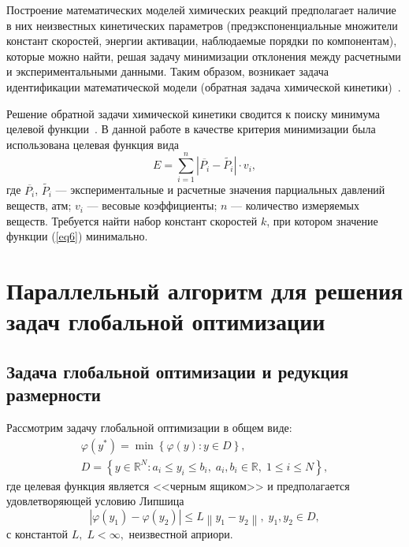 \documentclass{cmi1}
\begin{document}
Построение математических моделей химических реакций предполагает наличие в них неизвестных кинетических параметров (предэкспоненциальные множители констант скоростей, энергии активации, наблюдаемые порядки по компонентам), которые можно найти, решая задачу минимизации отклонения между расчетными и экспериментальными данными. Таким образом, возникает задача идентификации математической модели (обратная задача химической кинетики)~.

Решение обратной задачи химической кинетики сводится к поиску минимума целевой функции~. В данной работе в качестве критерия минимизации была использована целевая функция вида
\begin{equation}\label{eq6}
E=\sum_{i=1}^n \left|\overline{P_{i}}-\widetilde{P_{i}}\right|\cdot v_{i},
\end{equation}
где $\overline{P_{i}}$, $\widetilde{P_{i}}$ --- экспериментальные и расчетные значения парциальных давлений веществ, атм; $v_{i}$ --- весовые коэффициенты; $n$ --- количество измеряемых веществ.
Требуется найти набор констант скоростей $k$, при котором значение функции (\ref{eq6}) минимально.

\section{Параллельный алгоритм для решения задач глобальной оптимизации} \label{sec-PGSA}
\subsection{Задача глобальной оптимизации и редукция размерности}

Рассмотрим задачу глобальной оптимизации в общем виде:
\begin{gather}
 \varphi(y^\ast)=\min{\left\{\varphi(y):y\in D\right\}}, \label{problem}\\
 D=\left\{y\in \mathbb{R}^N: a_i\leqslant y_i \leqslant b_i, \; a_i,b_i\in \mathbb{R}, \;  1\leqslant i \leqslant N\right\} \label{D},
\end{gather}
где целевая функция является <<черным ящиком>> и предполагается удовлетворяющей условию Липшица
\[
\left|\varphi(y_1)-\varphi(y_2)\right|\leqslant L\left\|y_1-y_2\right\|,\; y_1,y_2 \in D,
\]
с константой $L, \; L<\infty,$ неизвестной априори.
\end{document}
